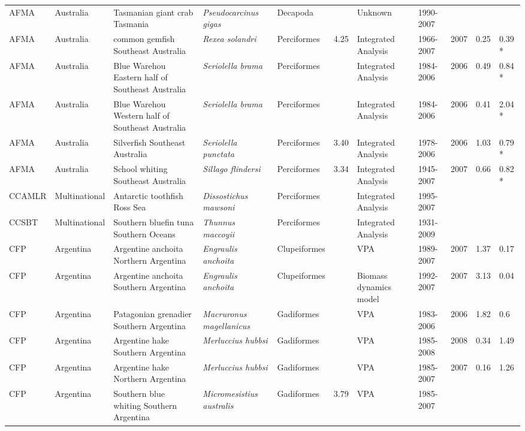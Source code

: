 \begin{longtable}{p{1.5cm}p{1.5cm}p{3cm}p{3cm}p{2.5cm}p{0.9cm}p{1.4cm}p{0.9cm}p{0.9cm}p{0.9cm}p{1cm}}
  AFMA & Australia & Tasmanian giant crab Tasmania & \textit{Pseudocarcinus gigas} & Decapoda &  & Unknown & 1990-2007 &  &  &  \\ 
  AFMA & Australia & common gemfish Southeast Australia & \textit{Rexea solandri} & Perciformes & 4.25 & Integrated Analysis & 1966-2007 & 2007 & 0.25 & 0.39 * \\ 
  AFMA & Australia & Blue Warehou Eastern half of Southeast Australia & \textit{Seriolella brama} & Perciformes &  & Integrated Analysis & 1984-2006 & 2006 & 0.49 & 0.84 * \\ 
  AFMA & Australia & Blue Warehou Western half of Southeast Australia & \textit{Seriolella brama} & Perciformes &  & Integrated Analysis & 1984-2006 & 2006 & 0.41 & 2.04 * \\ 
  AFMA & Australia & Silverfish Southeast Australia & \textit{Seriolella punctata} & Perciformes & 3.40 & Integrated Analysis & 1978-2006 & 2006 & 1.03 & 0.79 * \\ 
  AFMA & Australia & School whiting Southeast Australia & \textit{Sillago flindersi} & Perciformes & 3.34 & Integrated Analysis & 1945-2007 & 2007 & 0.66 & 0.82 * \\ 
  CCAMLR & Multinational & Antarctic toothfish Ross Sea & \textit{Dissostichus mawsoni} & Perciformes &  & Integrated Analysis & 1995-2007 &  &  &  \\ 
  CCSBT & Multinational & Southern bluefin tuna Southern Oceans & \textit{Thunnus maccoyii} & Perciformes &  & Integrated Analysis & 1931-2009 &  &  &  \\ 
  CFP & Argentina & Argentine anchoita Northern Argentina & \textit{Engraulis anchoita} & Clupeiformes &  & VPA & 1989-2007 & 2007 & 1.37 & 0.17 \\ 
  CFP & Argentina & Argentine anchoita Southern Argentina & \textit{Engraulis anchoita} & Clupeiformes &  & Biomass dynamics model & 1992-2007 & 2007 & 3.13 & 0.04 \\ 
  CFP & Argentina & Patagonian grenadier Southern Argentina & \textit{Macruronus magellanicus} & Gadiformes &  & VPA & 1983-2006 & 2006 & 1.82 & 0.6 \\ 
  CFP & Argentina & Argentine hake Southern Argentina & \textit{Merluccius hubbsi} & Gadiformes &  & VPA & 1985-2008 & 2008 & 0.34 & 1.49 \\ 
  CFP & Argentina & Argentine hake Northern Argentina & \textit{Merluccius hubbsi} & Gadiformes &  & VPA & 1985-2007 & 2007 & 0.16 & 1.26 \\ 
  CFP & Argentina &  Southern blue whiting Southern Argentina & \textit{Micromesistius australis} & Gadiformes & 3.79 & VPA & 1985-2007 &  &  &  \\ 

\end{longtable}
